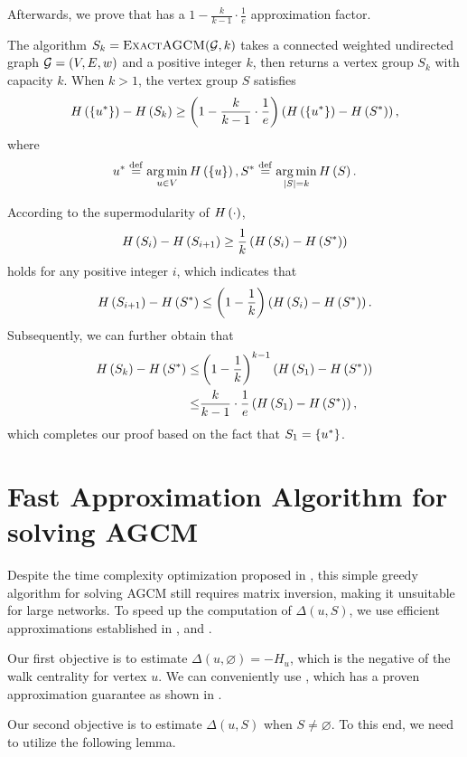 \documentclass[10pt,journal,compsoc,twocolumn,twoside]{IEEEtran}
\begin{document}
Afterwards, we prove that  has a \(1-\frac{k}{k-1}\cdot\frac{1}{e}\) approximation factor.
\begin{theorem}
    The algorithm \(S_k=\textsc{ExactAGCM}(\mathcal{G},k)\) takes a connected weighted undirected graph \(\mathcal{G}=(V,E,w)\) and a positive integer \(k\), then returns a vertex group \(S_k\) with capacity \(k\).
    When \(k>1\), the vertex group \(S\) satisfies
    \[H\left(\left\{u^* \right\}\right)-H\left(S_k\right)\ge\left( 1-\frac{k}{k-1}\cdot\frac{1}{e} \right)\left( H\left(\left\{u^* \right\}\right)-H\left(S^*\right) \right),\]
    where
    \[u^*\stackrel{\mathrm{def}}{=}\operatorname*{arg\,min}_{u\in V}H\left(\left\{u \right\}\right),S^*\stackrel{\mathrm{def}}{=}\operatorname*{arg\,min}_{\left|S \right|=k}H\left(S\right).\]
\end{theorem}
\begin{IEEEproof}
    According to the supermodularity of \(H\left(\cdot\right)\),
    \[H\left(S_i\right)-H\left(S_{i+1}\right)\ge\frac{1}{k}\left( H\left(S_i\right)-H\left(S^*\right) \right)\]
    holds for any positive integer \(i\), which indicates that
    \[H\left(S_{i+1}\right)-H\left(S^*\right)\le\left( 1-\frac{1}{k} \right)\left( H\left(S_i\right)-H\left(S^*\right) \right).\]
    Subsequently, we can further obtain that
    \begin{align*}
        H\left(S_k\right)-H\left(S^*\right)\le & \left( 1-\frac{1}{k} \right)^{k-1}\left( H\left(S_1\right)-H\left(S^*\right) \right)    \\
        \le                      & \frac{k}{k-1}\cdot\frac{1}{e}\left( H\left(S_1\right)-H\left(S^*\right) \right),
    \end{align*}
    which completes our proof based on the fact that \(S_1=\left\{u^* \right\}\).
\end{IEEEproof}

\section{Fast Approximation Algorithm for solving AGCM}\label{sec:approx-algo2}

Despite the time complexity optimization proposed in , this simple greedy algorithm for solving AGCM still requires matrix inversion, making it unsuitable for large networks.
To speed up the computation of \(\Delta(u,S)\), we use efficient approximations established in ,  and .

Our first objective is to estimate \(\Delta(u,\varnothing)=-H_u\), which is the negative of the walk centrality for vertex \(u\).
We can conveniently use , which has a proven approximation guarantee as shown in .

Our second objective is to estimate \(\Delta(u,S)\) when \(S\neq\varnothing\).
To this end, we need to utilize the following lemma.
\end{document}
